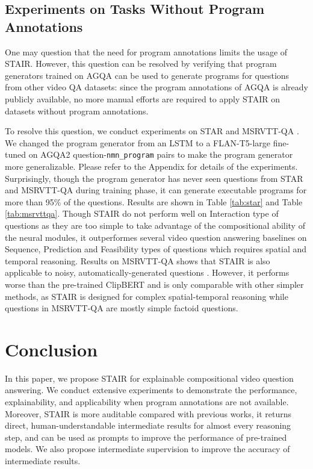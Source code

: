 \documentclass[letterpaper]{article} %
\begin{document}
\subsection{Experiments on Tasks Without Program Annotations} \label{sec:other_task}

One may question that the need for program annotations limits the usage of STAIR. However, this question can be resolved by verifying that program generators trained on AGQA can be used to generate programs for questions from other video QA datasets: since the program annotations of AGQA is already publicly available, no more manual efforts are required to apply STAIR on datasets without program annotations.

To resolve this question, we conduct experiments on STAR \cite{Wu2021STAR} and MSRVTT-QA \cite{Xu2017VideoQA}. We changed the program generator from an LSTM to a FLAN-T5-large \cite{wei2021finetunedLM} fine-tuned on AGQA2 question-\texttt{nmn\_program} pairs to make the program generator more generalizable. Please refer to the Appendix for details of the experiments. Surprisingly, though the program generator has never seen questions from STAR and MSRVTT-QA during training phase, it can generate executable programs for more than 95\% of the questions. Results are shown in Table \ref{tab:star} and Table \ref{tab:msrvttqa}. Though STAIR do not perform well on Interaction type of questions as they are too simple to take advantage of the compositional ability of the neural modules, it outperformes several video question answering baselines on Sequence, Prediction and Feasibility types of questions which requires spatial and temporal reasoning. Results on MSRVTT-QA shows that STAIR is also applicable to noisy, automatically-generated questions \cite{Lin2022TowardsFA}. However, it performs worse than the pre-trained ClipBERT and is only comparable with other simpler methods, as STAIR is designed for complex spatial-temporal reasoning while questions in MSRVTT-QA are mostly simple factoid questions. 

\section{Conclusion}
In this paper, we propose STAIR for explainable compositional video question answering. We conduct extensive experiments to demonstrate the performance, explainability, and applicability when program annotations are not available. Moreover, STAIR is more auditable compared with previous works, it returns direct, human-understandable intermediate results for almost every reasoning step, and can be used as prompts to improve the performance of pre-trained models. We also propose intermediate supervision to improve the accuracy of intermediate results.
\end{document}
